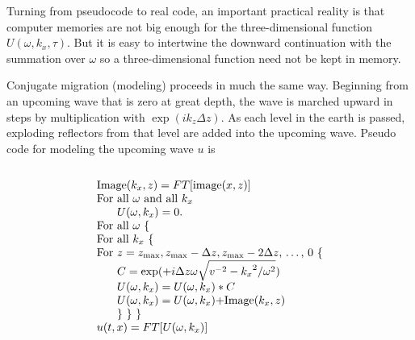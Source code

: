\par
Turning from pseudocode to real code,
an important practical reality
is that computer memories are not big enough
for the three-dimensional function $U(\omega, k_x, \tau)$.
But it is easy to intertwine the downward continuation
with the summation over $\omega$
so a three-dimensional function need not be kept in memory.

\par
Conjugate migration (modeling) proceeds in much the same way.
Beginning from an upcoming wave that is zero at great depth,
the wave is marched upward in steps
by multiplication with  $\exp ( i k_z \Delta z )$.
As each level in the earth is passed,
exploding reflectors from that level are added into the upcoming wave.
Pseudo code for modeling the upcoming wave  $u$  is
\par\noindent
$$\vbox{
\begin{tabbing}
Image$(k_x, z) = FT[$image$(x, z)]$    \\
For \= all $\omega$ and all $k_x$    \\
    \> $U(\omega, k_x) = 0$.         \\
For all $\omega$ \{                  \\
For all $k_x$ \{                     \\
For $z = z_{\rm max}, z_{\rm max} -\Delta z, z_{\rm max} -2\Delta z
         $, \ldots, $0$ \{           \\
    \> $C = \exp(+i\Delta z\omega\sqrt{v^{-2} -
            {k_x}^2/\omega^2})$          \\
    \> $U(\omega, k_x) = U(\omega, k_x) \ast C $     \\
    \> $U(\omega, k_x) = U(\omega, k_x)  + $Image$(k_x, z)$     \\
    \> \} \} \}                      \\
$u(t, x) = FT[U(\omega, k_x)]$       \\
\end{tabbing}
}$$
\par\noindent

